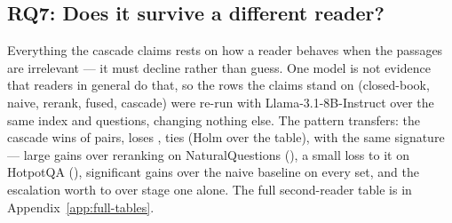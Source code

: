 \subsection{RQ7: Does it survive a different reader?}
\label{sec:results-reader}

Everything the cascade claims rests on how a reader behaves when the
passages are irrelevant --- it must decline rather than guess. One model
is not evidence that readers in general do that, so the rows the claims
stand on (closed-book, naive, rerank, fused, cascade) were re-run with
Llama-3.1-8B-Instruct over the same index and questions, changing nothing
else. The pattern transfers: the cascade wins \ResultLlamaWins{} of
\ResultLlamaPairs{} pairs, loses \ResultLlamaLosses{}, ties
\ResultLlamaTies{} (Holm over the table), with the same signature ---
large gains over reranking on NaturalQuestions
(\RerankVsCascadeLlamaNQExactMatchDiff), a small loss to it on HotpotQA
(\RerankVsCascadeLlamaHotpotQAExactMatchDiff), significant gains over the
naive baseline on every set, and the escalation worth
\FusedVsCascadeLlamaNQExactMatchDiff{} to
\FusedVsCascadeLlamaTwoWikiExactMatchDiff{} over stage one alone. The
full second-reader table is in Appendix~\ref{app:full-tables}.
